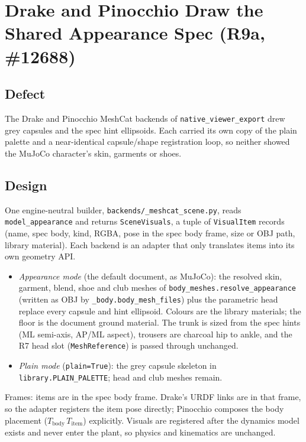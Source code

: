 \section{Drake and Pinocchio Draw the Shared Appearance Spec (R9a, \#12688)}

\subsection{Defect}
The Drake and Pinocchio MeshCat backends of \texttt{native\_viewer\_export}
drew grey capsules and the spec hint ellipsoids. Each carried its own copy of
the plain palette and a near-identical capsule/shape registration loop, so
neither showed the MuJoCo character's skin, garments or shoes.

\subsection{Design}
One engine-neutral builder, \texttt{backends/\_meshcat\_scene.py}, reads
\texttt{model\_appearance} and returns \texttt{SceneVisuals}, a tuple of
\texttt{VisualItem} records (name, spec body, kind, RGBA, pose in the spec
body frame, size or OBJ path, library material). Each backend is an adapter
that only translates items into its own geometry API.
\begin{itemize}
\item \emph{Appearance mode} (the default document, as MuJoCo): the resolved
  skin, garment, blend, shoe and club meshes of
  \texttt{body\_meshes.resolve\_appearance} (written as OBJ by
  \texttt{\_body.body\_mesh\_files}) plus the parametric head replace every
  capsule and hint ellipsoid. Colours are the library materials; the floor is
  the document ground material. The trunk is sized from the spec hints
  (ML semi-axis, AP/ML aspect), trousers are charcoal hip to ankle, and the
  R7 head slot (\texttt{MeshReference}) is passed through unchanged.
\item \emph{Plain mode} (\texttt{plain=True}): the grey capsule skeleton in
  \texttt{library.PLAIN\_PALETTE}; head and club meshes remain.
\end{itemize}
Frames: items are in the spec body frame. Drake's URDF links are in that
frame, so the adapter registers the item pose directly; Pinocchio composes the
body placement ($T_{\mathrm{body}}\,T_{\mathrm{item}}$) explicitly. Visuals are
registered after the dynamics model exists and never enter the plant, so
physics and kinematics are unchanged.

